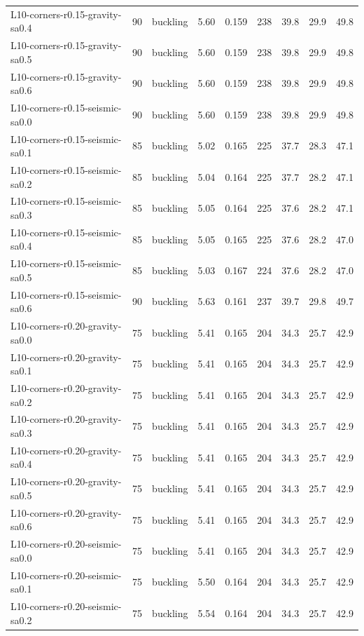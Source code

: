 \begin{tabular}{lrlrrrrrr}
L10-corners-r0.15-gravity-sa0.4 & 90 & buckling & 5.60 & 0.159 & 238 & 39.8 & 29.9 & 49.8 \\
L10-corners-r0.15-gravity-sa0.5 & 90 & buckling & 5.60 & 0.159 & 238 & 39.8 & 29.9 & 49.8 \\
L10-corners-r0.15-gravity-sa0.6 & 90 & buckling & 5.60 & 0.159 & 238 & 39.8 & 29.9 & 49.8 \\
L10-corners-r0.15-seismic-sa0.0 & 90 & buckling & 5.60 & 0.159 & 238 & 39.8 & 29.9 & 49.8 \\
L10-corners-r0.15-seismic-sa0.1 & 85 & buckling & 5.02 & 0.165 & 225 & 37.7 & 28.3 & 47.1 \\
L10-corners-r0.15-seismic-sa0.2 & 85 & buckling & 5.04 & 0.164 & 225 & 37.7 & 28.2 & 47.1 \\
L10-corners-r0.15-seismic-sa0.3 & 85 & buckling & 5.05 & 0.164 & 225 & 37.6 & 28.2 & 47.1 \\
L10-corners-r0.15-seismic-sa0.4 & 85 & buckling & 5.05 & 0.165 & 225 & 37.6 & 28.2 & 47.0 \\
L10-corners-r0.15-seismic-sa0.5 & 85 & buckling & 5.03 & 0.167 & 224 & 37.6 & 28.2 & 47.0 \\
L10-corners-r0.15-seismic-sa0.6 & 90 & buckling & 5.63 & 0.161 & 237 & 39.7 & 29.8 & 49.7 \\
L10-corners-r0.20-gravity-sa0.0 & 75 & buckling & 5.41 & 0.165 & 204 & 34.3 & 25.7 & 42.9 \\
L10-corners-r0.20-gravity-sa0.1 & 75 & buckling & 5.41 & 0.165 & 204 & 34.3 & 25.7 & 42.9 \\
L10-corners-r0.20-gravity-sa0.2 & 75 & buckling & 5.41 & 0.165 & 204 & 34.3 & 25.7 & 42.9 \\
L10-corners-r0.20-gravity-sa0.3 & 75 & buckling & 5.41 & 0.165 & 204 & 34.3 & 25.7 & 42.9 \\
L10-corners-r0.20-gravity-sa0.4 & 75 & buckling & 5.41 & 0.165 & 204 & 34.3 & 25.7 & 42.9 \\
L10-corners-r0.20-gravity-sa0.5 & 75 & buckling & 5.41 & 0.165 & 204 & 34.3 & 25.7 & 42.9 \\
L10-corners-r0.20-gravity-sa0.6 & 75 & buckling & 5.41 & 0.165 & 204 & 34.3 & 25.7 & 42.9 \\
L10-corners-r0.20-seismic-sa0.0 & 75 & buckling & 5.41 & 0.165 & 204 & 34.3 & 25.7 & 42.9 \\
L10-corners-r0.20-seismic-sa0.1 & 75 & buckling & 5.50 & 0.164 & 204 & 34.3 & 25.7 & 42.9 \\
L10-corners-r0.20-seismic-sa0.2 & 75 & buckling & 5.54 & 0.164 & 204 & 34.3 & 25.7 & 42.9 \\

\end{tabular}
